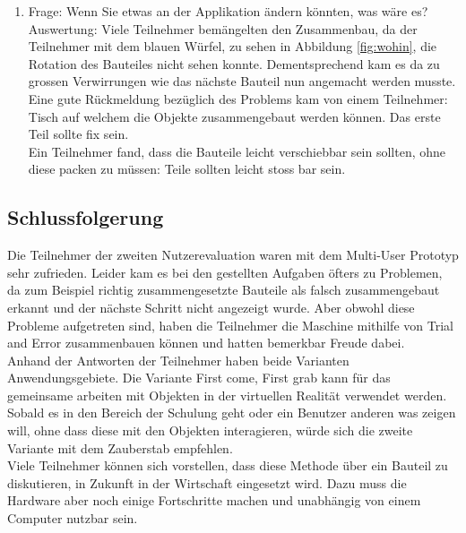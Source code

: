 \begin{enumerate} [itemsep=1pt,topsep=0pt]
	\item Frage: Wenn Sie etwas an der Applikation ändern könnten, was wäre es? \\
	Auswertung: Viele Teilnehmer bemängelten den Zusammenbau, da der Teilnehmer mit dem blauen Würfel, zu sehen in Abbildung \ref{fig:wohin}, die Rotation des Bauteiles nicht sehen konnte. Dementsprechend kam es da zu grossen Verwirrungen wie das nächste Bauteil nun angemacht werden musste. Eine gute Rückmeldung bezüglich des Problems kam von einem Teilnehmer: \grqq Tisch auf welchem die Objekte zusammengebaut werden können. Das erste Teil sollte fix sein.\grqq{} \\
	Ein Teilnehmer fand, dass die Bauteile leicht verschiebbar sein sollten, ohne diese packen zu müssen: \grqq Teile sollten leicht stoss bar sein.\grqq{}
\end{enumerate}

\pagebreak
\subsection{Schlussfolgerung}
Die Teilnehmer der zweiten Nutzerevaluation waren mit dem Multi-User Prototyp sehr zufrieden. Leider kam es bei den gestellten Aufgaben öfters zu Problemen, da zum Beispiel richtig zusammengesetzte Bauteile als falsch zusammengebaut erkannt und der nächste Schritt nicht angezeigt wurde. Aber obwohl diese Probleme aufgetreten sind, haben die Teilnehmer die Maschine mithilfe von \grqq Trial and Error\grqq{} zusammenbauen können und hatten bemerkbar Freude dabei. \\

\noindent Anhand der Antworten der Teilnehmer haben beide Varianten Anwendungsgebiete. Die Variante \grqq First come, First grab\grqq{} kann für das gemeinsame arbeiten mit Objekten in der virtuellen Realität verwendet werden. Sobald es in den Bereich der Schulung geht oder ein Benutzer anderen was zeigen will, ohne dass diese mit den Objekten interagieren, würde sich die zweite Variante mit dem Zauberstab empfehlen. \\

\noindent Viele Teilnehmer können sich vorstellen, dass diese Methode über ein Bauteil zu diskutieren, in Zukunft in der Wirtschaft eingesetzt wird. Dazu muss die Hardware aber noch einige Fortschritte machen und unabhängig von einem Computer nutzbar sein. 

